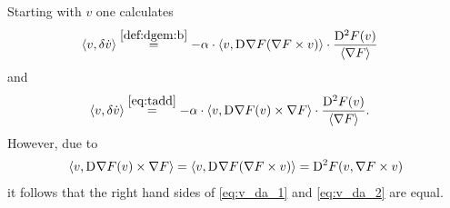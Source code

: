 Starting with $ v $ one calculates
\begin{align}
    \langle  v ,  \delta \dot{ v }  \rangle  &\overset{\eqref{def:dgem:b}}{=}
    -\alpha \cdot \langle  v ,  \mathrm{D}^{  }\nabla F( \nabla F \times v )  \rangle  \cdot
    \frac{ \mathrm{D}^{ 2 }F( v ) }{ \langle  \nabla F  \rangle }
    \label{eq:v_da_1}
\end{align}
and
\begin{align}
    \langle  v ,  \delta \dot{ v }  \rangle  &\overset{\eqref{eq:tadd}}{=}
    -\alpha \cdot \langle  v ,  \mathrm{D}^{  }\nabla F( v ) \times \nabla F  \rangle  \cdot
    \frac{ \mathrm{D}^{ 2 }F( v ) }{ \langle  \nabla F   \rangle } .
    \label{eq:v_da_2}
\end{align}
However, due to
\begin{align}
    \langle  v ,  \mathrm{D}^{  }\nabla F( v ) \times \nabla F  \rangle  =
    \langle  v ,  \mathrm{D}^{  }\nabla F( \nabla F \times v )  \rangle  =
    \mathrm{D}^{ 2 }F( v, \nabla F \times v )
\end{align}
it follows that the right hand sides
of \eqref{eq:v_da_1} and \eqref{eq:v_da_2} are equal.



